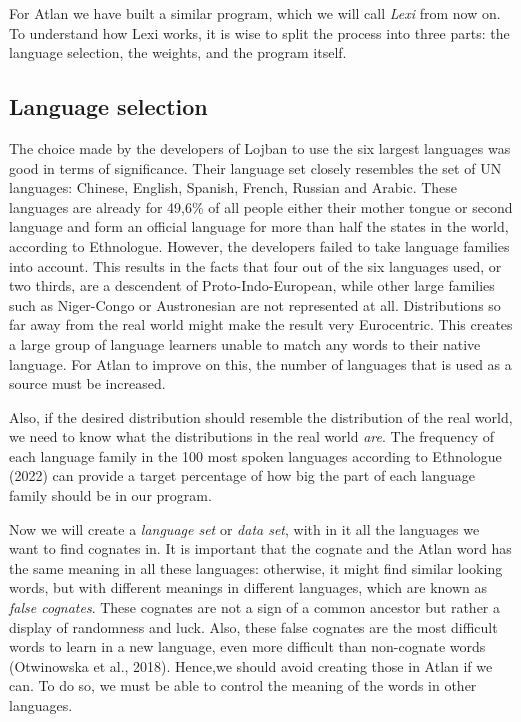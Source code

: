 For Atlan we have built a similar program, which we will call \textit{Lexi} from now on. To understand how Lexi works, it is wise to split the process into three parts: the language selection, the weights, and the program itself.  

\subsection{Language selection }

The choice made by the developers of Lojban to use the six largest languages was good in terms of significance. Their language set closely resembles the set of UN languages: Chinese, English, Spanish, French, Russian and Arabic. These languages are already for 49,6\% of all people either their mother tongue or second language and form an official language for more than half the states in the world, according to Ethnologue. However, the developers failed to take language families into account. This results in the facts that four out of the six languages used, or two thirds, are a descendent of Proto-Indo-European, while other large families such as Niger-Congo or Austronesian are not represented at all. Distributions so far away from the real world might make the result very Eurocentric. This creates a large group of language learners unable to match any words to their native language. For Atlan to improve on this, the number of languages that is used as a source must be increased. 

Also, if the desired distribution should resemble the distribution of the real world, we need to know what the distributions in the real world \textit{are}. The frequency of each language family in the 100 most spoken languages according to Ethnologue (2022) can provide a target percentage of how big the part of each language family should be in our program.  

Now we will create a \textit{language set} or \textit{data set}, with in it all the languages we want to find cognates in. It is important that the cognate and the Atlan word has the same meaning in all these languages: otherwise, it might find similar looking words, but with different meanings in different languages, which are known as \textit{false cognates}. These cognates are not a sign of a common ancestor but rather a display of randomness and luck. Also, these false cognates are the most difficult words to learn in a new language, even more difficult than non-cognate words (Otwinowska et al., 2018). Hence,we should avoid creating those in Atlan if we can. To do so, we must be able to control the meaning of the words in other languages. 

